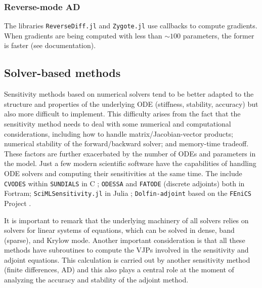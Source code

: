 \subsubsection{Reverse-mode AD}

The libraries \texttt{ReverseDiff.jl} and \texttt{Zygote.jl} use callbacks to compute gradients. 
When gradients are being computed with less than $\sim 100$ parameters, the former is faster (see documentation).

\cite{Baydin_Pearlmutter_Radul_Siskind_2015}

\subsection{Solver-based methods}

Sensitivity methods based on numerical solvers tend to be better adapted to the structure and properties of the underlying ODE (stiffness, stability, accuracy) but also more difficult to implement.  
This difficulty arises from the fact that the sensitivity method needs to deal with some numerical and computational considerations, including how to handle matrix/Jacobian-vector products; numerical stability of the forward/backward solver; and memory-time tradeoff. 
These factors are further exacerbated by the number of ODEs and parameters in the model. 
Just a few modern scientific software have the capabilities of handling ODE solvers and computing their sensitivities at the same time. 
The include \texttt{CVODES} within \texttt{SUNDIALS} in C \cite{serban2005cvodes, SUNDIALS-hindmarsh2005sundials}; \texttt{ODESSA} \cite{ODESSA} and \texttt{FATODE} (discrete adjoints) \cite{FATODE2014} both in Fortram; \texttt{SciMLSensitivity.jl} in Julia \cite{rackauckas2020universal}; \texttt{Dolfin-adjoint} based on the \texttt{FEniCS} Project \cite{dolfin2013, dolfin2018}. 

It is important to remark that the underlying machinery of all solvers relies on solvers for linear systems of equations, which can be solved in dense, band (sparse), and Krylow mode. 
Another important consideration is that all these methods have subroutines to compute the VJPs involved in the sensitivity and adjoint equations. 
This calculation is carried out by another sensitivity method (finite differences, AD) and this also plays a central role at the moment of analyzing the accuracy and stability of the adjoint method. 

